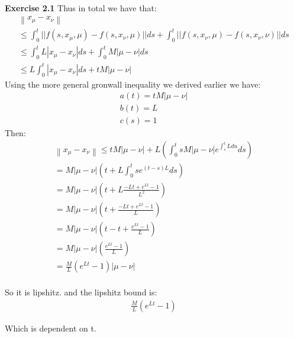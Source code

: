\documentclass[12pt]{article}
\newenvironment{exercise}[1]{\vspace{.1in}\noindent\textbf{Exercise #1 \hspace{.05em}}}{}
\newcommand{\norm}[1]{\left\lVert#1\right\rVert}
\begin{document}
\begin{exercise}{2.1}
	Thus in total we have that:
	\begin{align}
		\norm{x_\mu-x_\nu}                                                                             \\
		\leq \int_0^t ||f(s,x_\mu,\mu)-f(s,x_\nu,\mu)||ds+\int_0^t||f(s,x_\nu,\mu)-f(s,x_\nu,\nu)|| ds \\
		\leq \int_0^tL |x_\mu-x_\nu|ds+\int_0^t M|\mu-\nu|ds                                           \\
		\leq L\int_0^t |x_\mu-x_\nu|ds+tM|\mu-\nu|
	\end{align}
	Using the more general gronwall inequality we derived earlier we have:
	\begin{align}
		a(t)=tM|\mu-\nu| \\
		b(t)=L           \\
		c(s)=1
	\end{align}
	Then:
	\begin{align}
		\norm{x_\mu-x_\nu}\leq tM|\mu-\nu|+L(\int_0^tsM|\mu-\nu|e^{\int_s^tLdu}ds) \\
		=M|\mu-\nu|(t+L\int_0^tse^{(t-s)L}ds)                                      \\
		=M|\mu-\nu|(t+L\frac{-Lt+e^{Lt}-1}{L^2})                                   \\
		=M|\mu-\nu|(t+\frac{-Lt+e^{Lt}-1}{L})                                      \\
		=M|\mu-\nu|(t-t+\frac{e^{Lt}-1}{L})                                        \\
		=M|\mu-\nu|(\frac{e^{Lt}-1}{L})                                            \\
		=\frac{M}{L} (e^{Lt}-1)|\mu-\nu|                                           \\
	\end{align}

	So it is lipshitz. and the lipshitz bound is:
	\begin{align}
		\frac{M}{L} (e^{Lt}-1)
	\end{align}

	Which is dependent on t.


\end{exercise}
\end{document}
